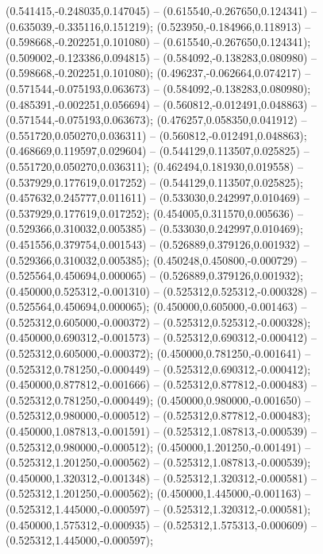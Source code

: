  (0.541415,-0.248035,0.147045) -- (0.615540,-0.267650,0.124341) -- (0.635039,-0.335116,0.151219);
 (0.523950,-0.184966,0.118913) -- (0.598668,-0.202251,0.101080) -- (0.615540,-0.267650,0.124341);
 (0.509002,-0.123386,0.094815) -- (0.584092,-0.138283,0.080980) -- (0.598668,-0.202251,0.101080);
 (0.496237,-0.062664,0.074217) -- (0.571544,-0.075193,0.063673) -- (0.584092,-0.138283,0.080980);
 (0.485391,-0.002251,0.056694) -- (0.560812,-0.012491,0.048863) -- (0.571544,-0.075193,0.063673);
 (0.476257,0.058350,0.041912) -- (0.551720,0.050270,0.036311) -- (0.560812,-0.012491,0.048863);
 (0.468669,0.119597,0.029604) -- (0.544129,0.113507,0.025825) -- (0.551720,0.050270,0.036311);
 (0.462494,0.181930,0.019558) -- (0.537929,0.177619,0.017252) -- (0.544129,0.113507,0.025825);
 (0.457632,0.245777,0.011611) -- (0.533030,0.242997,0.010469) -- (0.537929,0.177619,0.017252);
 (0.454005,0.311570,0.005636) -- (0.529366,0.310032,0.005385) -- (0.533030,0.242997,0.010469);
 (0.451556,0.379754,0.001543) -- (0.526889,0.379126,0.001932) -- (0.529366,0.310032,0.005385);
 (0.450248,0.450800,-0.000729) -- (0.525564,0.450694,0.000065) -- (0.526889,0.379126,0.001932);
 (0.450000,0.525312,-0.001310) -- (0.525312,0.525312,-0.000328) -- (0.525564,0.450694,0.000065);
 (0.450000,0.605000,-0.001463) -- (0.525312,0.605000,-0.000372) -- (0.525312,0.525312,-0.000328);
 (0.450000,0.690312,-0.001573) -- (0.525312,0.690312,-0.000412) -- (0.525312,0.605000,-0.000372);
 (0.450000,0.781250,-0.001641) -- (0.525312,0.781250,-0.000449) -- (0.525312,0.690312,-0.000412);
 (0.450000,0.877812,-0.001666) -- (0.525312,0.877812,-0.000483) -- (0.525312,0.781250,-0.000449);
 (0.450000,0.980000,-0.001650) -- (0.525312,0.980000,-0.000512) -- (0.525312,0.877812,-0.000483);
 (0.450000,1.087813,-0.001591) -- (0.525312,1.087813,-0.000539) -- (0.525312,0.980000,-0.000512);
 (0.450000,1.201250,-0.001491) -- (0.525312,1.201250,-0.000562) -- (0.525312,1.087813,-0.000539);
 (0.450000,1.320312,-0.001348) -- (0.525312,1.320312,-0.000581) -- (0.525312,1.201250,-0.000562);
 (0.450000,1.445000,-0.001163) -- (0.525312,1.445000,-0.000597) -- (0.525312,1.320312,-0.000581);
 (0.450000,1.575312,-0.000935) -- (0.525312,1.575313,-0.000609) -- (0.525312,1.445000,-0.000597);
